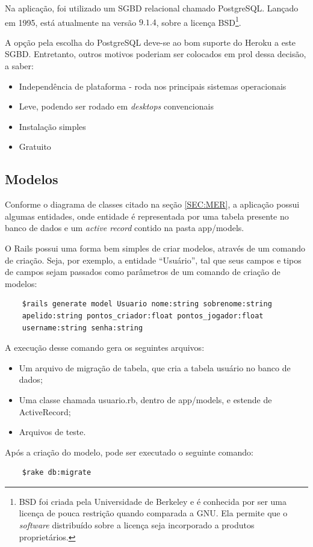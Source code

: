     Na aplicação, foi utilizado um \ac{SGBD} relacional chamado PostgreSQL. Lançado em 1995, está atualmente na versão $9.1.4$, sobre a licença BSD\footnote{BSD foi criada pela Universidade de Berkeley e é conhecida por ser uma licença de pouca restrição quando comparada a GNU. Ela permite que o \emph{software} distribuído sobre a licença seja incorporado a produtos proprietários.}.
	
    A opção pela escolha do PostgreSQL deve-se ao bom suporte do Heroku a este \ac{SGBD}. Entretanto, outros motivos poderiam ser colocados em prol dessa decisão, a saber:
\begin{itemize}
\item Independência de plataforma - roda nos principais sistemas operacionais
\item Leve, podendo ser rodado em \emph{desktops} convencionais
\item Instalação simples
\item Gratuito
\end{itemize}
    \subsection{Modelos}
            Conforme o diagrama de classes citado na seção \ref{SEC:MER}, a aplicação possui algumas entidades, onde entidade é representada por uma tabela presente no banco de dados e um \emph{active record} contido na pasta app/models.
			
            O Rails possui uma forma bem simples de criar modelos, através de um comando de criação. Seja, por exemplo, a entidade ``Usuário'', tal que seus campos e tipos de campos sejam passados como parâmetros de um comando de criação de modelos:
			
\begin{lstlisting}
    $rails generate model Usuario nome:string sobrenome:string 
	apelido:string pontos_criador:float pontos_jogador:float 
	username:string senha:string
\end{lstlisting}
            A execução desse comando gera os seguintes arquivos:
\begin{itemize}
\item Um arquivo de migração de tabela, que cria a tabela usuário no banco de dados;
\item Uma classe chamada usuario.rb,  dentro de app/models,  e estende de ActiveRecord;
\item Arquivos de teste.

\end{itemize}     
    Após a criação do modelo, pode ser executado o seguinte comando:
	\begin{lstlisting}
    $rake db:migrate
     \end{lstlisting}
	 
